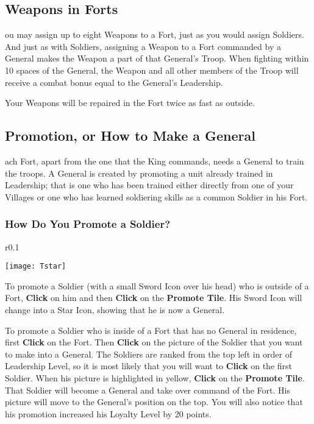 \subsection{Weapons in Forts}


ou may assign up to eight Weapons to a Fort, just as you would assign Soldiers. And just as with Soldiers, assigning a Weapon to a Fort commanded by a General makes the Weapon a part of that General’s Troop. When fighting within 10 spaces of the General, the Weapon and all other members of the Troop will receive a combat bonus equal to the General’s Leadership.

Your Weapons will be repaired in the Fort twice as fast as outside.

\subsection{Promotion, or How to Make a General}


ach Fort, apart from the one that the King commands, needs a General to train the troops. A General is created by promoting a unit already trained in Leadership; that is one who has been trained either directly from one of your Villages or one who has learned soldiering skills as a common Soldier in his Fort.

\subsubsection{How Do You Promote a Soldier?}

\begin{wrapfigure}{r}{0.1\textwidth}
    \vspace{-20pt}
    \begin{center}
        \texttt{[image: Tstar]}
    \end{center}
    \vspace{-20pt}
\end{wrapfigure}

To promote a Soldier (with a small Sword Icon over his head) who is outside of a Fort, \textbf{Click} on him and then \textbf{Click} on the \textbf{Promote Tile}. His Sword Icon will change into a Star Icon, showing that he is now a General.

To promote a Soldier who is inside of a Fort that has no General in residence, first \textbf{Click} on the Fort. Then \textbf{Click} on the picture of the Soldier that you want to make into a General. The Soldiers are ranked from the top left in order of Leadership Level, so it is most likely that you will want to \textbf{Click} on the first Soldier. When his picture is highlighted in yellow, \textbf{Click} on the \textbf{Promote Tile}. That Soldier will become a General and take over command of the Fort. His picture will move to the General’s position on the top. You will also notice that his promotion increased his Loyalty Level by 20 points.

